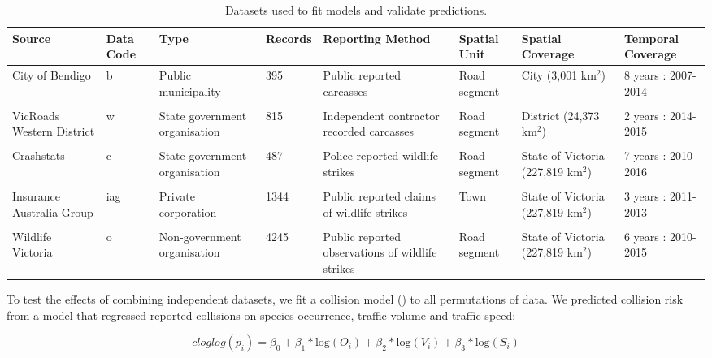 \begin{table}[htp]
\caption[Datasets used to fit collision models and validate predictions]{Datasets used to fit models and validate predictions.}
\centering
\begin{tabularx}{0.9\textwidth}{YYYYYYYY} \toprule
Source						&Data Code	&Type	&Records	&Reporting Method	&Spatial Unit	&Spatial Coverage	&Temporal Coverage \\ \midrule

City of Bendigo		&b		&Public municipality			&395		&Public reported carcasses			&Road segment		&City (3,001 km$^2$)	&8 years : 2007-2014 \\

&&&&&&\\

VicRoads Western District	&w		&State government organisation	&815		&Independent contractor recorded  carcasses			&Road segment		&District (24,373 km$^2$)	&2 years : 2014-2015 \\

&&&&&&\\

Crashstats		&c			&State government organisation	&487		&Police reported wildlife strikes			&Road segment		&State of Victoria (227,819 km$^2$)	&7 years : 2010-2016 \\

&&&&&&\\

Insurance Australia Group	&iag	&Private corporation			&1344		&Public reported claims of wildlife strikes			&Town		&State of Victoria (227,819 km$^2$)	&3 years : 2011-2013 \\

&&&&&&\\

Wildlife Victoria	&o		&Non-government organisation	&4245		&Public reported observations of wildlife strikes			&Road segment		&State of Victoria (227,819 km$^2$)	&6 years : 2010-2015 \\

\bottomrule
\end{tabularx}
\label{val_data}
\end{table}

To test the effects of combining independent datasets, we fit a collision model () to all permutations of data.  We predicted collision risk from a model that regressed reported collisions on species occurrence, traffic volume and traffic speed:

\begin{equation} \label{eq:61}
cloglog(p_i) = \beta_0 + \beta_1*\text{log}(O_i) + \beta_2*\text{log}(V_i) + \beta_3*\text{log}(S_i)
\end{equation}

